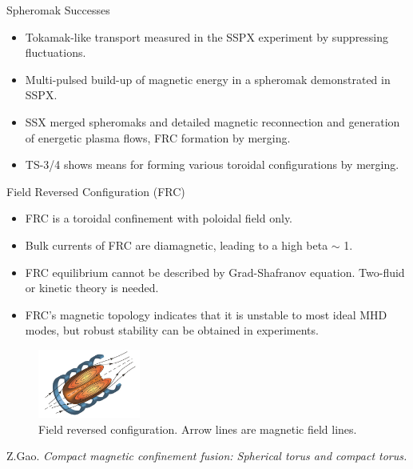 \begin{frame} {Spheromak Successes \cite{woodruff_2008_technical}}
    \begin{itemize}
        \item Tokamak-like transport measured in the SSPX experiment by suppressing fluctuations.
        \item Multi-pulsed build-up of magnetic energy in a spheromak demonstrated in SSPX.
        \item SSX merged spheromaks and detailed magnetic reconnection and generation of energetic plasma flows, FRC formation by merging.
        \item TS-3/4 shows means for forming various toroidal configurations by merging.
    \end{itemize}
\end{frame}

\begin{frame} {Field Reversed Configuration (FRC)}
    \begin{itemize}
        \item FRC is a toroidal confinement with poloidal field only.
        \item Bulk currents of FRC are diamagnetic, leading to a high beta $\sim$ 1.
        \item FRC equilibrium cannot be described by Grad-Shafranov equation. Two-fluid or kinetic theory is needed.
        \item FRC's magnetic topology indicates that it is unstable to most ideal MHD modes, but robust stability can be obtained in experiments.
    \end{itemize}

    \begin{figure}
        \centering
        \includegraphics[width=0.3\textwidth]{figures/frc.png}
        \caption{Field reversed configuration. \cite{gao_2016_compact} Arrow lines are magnetic field lines.}
        \label{fig:frc}
    \end{figure}

    \tiny \cite{gao_2016_compact} Z.Gao. \textit{Compact magnetic confinement fusion: Spherical torus and compact torus.}
\end{frame}

